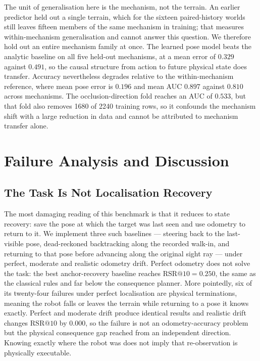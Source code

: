\documentclass[conference]{IEEEtran}
\begin{document}
The unit of generalisation here is the mechanism, not the terrain. An earlier
predictor held out a single terrain, which for the sixteen paired-history worlds still
leaves fifteen members of the same mechanism in training; that measures
within-mechanism generalisation and cannot answer this question. We therefore hold out
an entire mechanism family at once. The learned pose model beats the analytic baseline
on all five held-out mechanisms, at a mean error of $0.329$ against $0.491$, so the
causal structure from action to future physical state does transfer. Accuracy
nevertheless degrades relative to the within-mechanism reference, where mean pose
error is $0.196$ and mean AUC $0.897$ against $0.810$ across mechanisms. The
occlusion-direction fold reaches an AUC of $0.533$, but that fold also removes 1680 of
2240 training rows, so it confounds the mechanism shift with a large reduction in data
and cannot be attributed to mechanism transfer alone.

\section{Failure Analysis and Discussion}
\label{sec:discussion}

\subsection{The Task Is Not Localisation Recovery}

The most damaging reading of this benchmark is that it reduces to state recovery:
save the pose at which the target was last seen and use odometry to return to it. We
implement three such baselines --- steering back to the last-visible pose,
dead-reckoned backtracking along the recorded walk-in, and returning to that pose
before advancing along the original sight ray --- under perfect, moderate and
realistic odometry drift. Perfect odometry does not solve the task: the best
anchor-recovery baseline reaches $\mathrm{RSR}@10 = 0.250$, the same as the classical
rules and far below the consequence planner. More pointedly, six of its twenty-four
failures under perfect localisation are physical terminations, meaning the robot falls
or leaves the terrain while returning to a pose it knows exactly. Perfect and moderate
drift produce identical results and realistic drift changes $\mathrm{RSR}@10$ by
$0.000$, so the failure is not an odometry-accuracy problem but the physical
consequence gap reached from an independent direction. Knowing exactly where the robot
was does not imply that re-observation is physically executable.
\end{document}
